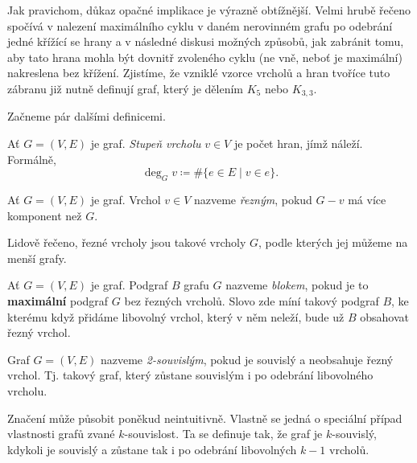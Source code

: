 Jak pravichom, důkaz opačné implikace je výrazně obtížnější. Velmi hrubě řečeno
spočívá v nalezení maximálního cyklu v daném nerovinném grafu po odebrání jedné
křížící se hrany a v následné diskusi možných způsobů, jak zabránit tomu, aby
tato hrana mohla být dovnitř zvoleného cyklu (ne vně, neboť je maximální)
nakreslena bez křížení. Zjistíme, že vzniklé vzorce vrcholů a hran tvoříce tuto
zábranu již nutně definují graf, který je dělením $K_5$ nebo $K_{3,3}$.

Začneme pár dalšími definicemi.

\begin{definition}
 \label{def:stupen-vrcholu}
 Ať $G = (V,E)$ je graf. \emph{Stupeň vrcholu} $v \in V$ je počet hran, jímž
 náleží. Formálně,
 \[
  \deg_G v \coloneqq \# \{e \in E \mid v \in e\}.
 \]
\end{definition}

\begin{definition}
 \label{def:rezny-vrchol}
 Ať $G = (V,E)$ je graf. Vrchol $v \in V$ nazveme \emph{řezným}, pokud $G - v$
 má více komponent než $G$.
\end{definition}

Lidově řečeno, řezné vrcholy jsou takové vrcholy $G$, podle kterých jej můžeme
 na menší grafy.

\begin{definition}[Blok]
 \label{def:blok}
 Ať $G = (V,E)$ je graf. Podgraf $B$ grafu $G$ nazveme \emph{blokem}, pokud je
 to \textbf{maximální} podgraf $G$ bez řezných vrcholů. Slovo  zde
 míní takový podgraf $B$, ke kterému když přidáme libovolný vrchol, který v něm
 neleží, bude už $B$ obsahovat řezný vrchol.
\end{definition}

\begin{definition}[2-souvislost]
 \label{def:2-souvislost}
 Graf $G = (V,E)$ nazveme \emph{2-souvislým}, pokud je souvislý a neobsahuje
 řezný vrchol. Tj. takový graf, který zůstane souvislým i po odebrání
 libovolného vrcholu.
\end{definition}

\begin{remark}
 Značení  může působit poněkud neintuitiv\-ně. Vlastně se jedná o
 speciální případ vlastnosti grafů zvané $k$-souvis\-lost. Ta se definuje tak,
 že graf je $k$-souvislý, kdykoli je souvislý a zůstane tak i po odebrání
 libovolných $k-1$ vrcholů.
\end{remark}

